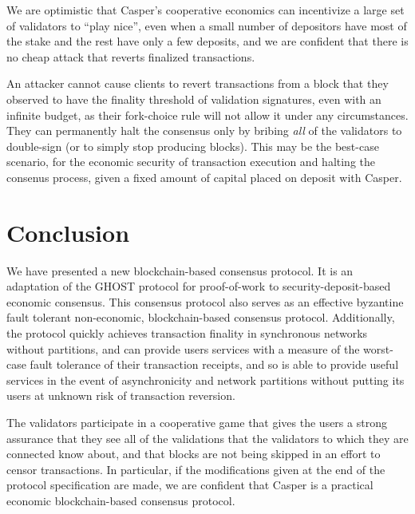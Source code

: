 \documentclass[11pt,a4paper]{article}
\begin{document}
We are optimistic that Casper's cooperative economics can incentivize a large set of validators to ``play nice'', even when a small number of depositors have most of the stake and the rest have only a few deposits, and we are confident that there is no cheap attack that reverts finalized transactions.

An attacker cannot cause clients to revert transactions from a block that they observed to have the finality threshold of validation signatures, even with an infinite budget, as their fork-choice rule will not allow it under any circumstances. They can permanently halt the consensus only by bribing \emph{all} of the validators to double-sign (or to simply stop producing blocks). This may be the best-case scenario, for the economic security of transaction execution and halting the consenus process, given a fixed amount of capital placed on deposit with Casper.


\section{Conclusion}

We have presented a new blockchain-based consensus protocol. It is an adaptation of the GHOST protocol for proof-of-work to security-deposit-based economic consensus. This consensus protocol also serves as an effective byzantine fault tolerant non-economic, blockchain-based consensus protocol. Additionally, the protocol quickly achieves transaction finality in synchronous networks without partitions, and can provide users services with a measure of the worst-case fault tolerance of their transaction receipts, and so is able to provide useful services in the event of asynchronicity and network partitions without putting its users at unknown risk of transaction reversion. 

The validators participate in a cooperative game that gives the users a strong assurance that they see all of the validations that the validators to which they are connected know about, and that blocks are not being skipped in an effort to censor transactions. In particular, if the modifications given at the end of the protocol specification are made, we are confident that Casper is a practical economic blockchain-based consensus protocol.



\end{document}
